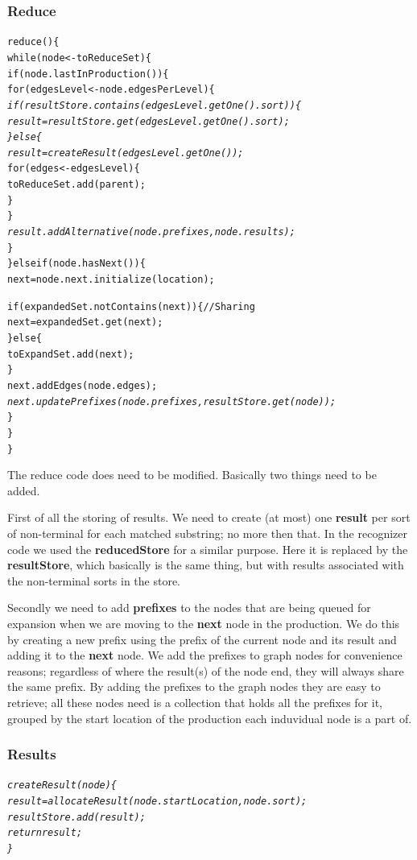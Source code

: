 \documentclass[a4paper,10pt]{article}
\begin{document}
\pagebreak
\subsubsection{Reduce}
{\small
\begin{alltt}
reduce()\{
  while(node <- toReduceSet)\{
    if(node.lastInProduction())\{
      for(edgesLevel <- node.edgesPerLevel)\{\textit{
        if(resultStore.contains(edgesLevel.getOne().sort))\{
          result = resultStore.get(edgesLevel.getOne().sort);
        \}else\{
          result = createResult(edgesLevel.getOne());}
          for(edges <- edgesLevel)\{
            toReduceSet.add(parent);
          \}
        \}\textit{
        result.addAlternative(node.prefixes, node.results);}
      \}
    \}else if(node.hasNext())\{
      next = node.next.initialize(location);
      
      if(expandedSet.notContains(next))\{ // Sharing
        next = expandedSet.get(next);
      \}else\{
        toExpandSet.add(next);
      \}
      next.addEdges(node.edges);\textit{
      next.updatePrefixes(node.prefixes, resultStore.get(node));}
    \}
  \}
\}
\end{alltt}
}

The reduce code does need to be modified. Basically two things need to be added.

First of all the storing of results. We need to create (at most) one {\bf result} per sort of non-terminal for each matched substring; no more then that. In the recognizer code we used the {\bf reducedStore} for a similar purpose. Here it is replaced by the {\bf resultStore}, which basically is the same thing, but with results associated with the non-terminal sorts in the store.

Secondly we need to add {\bf prefixes} to the nodes that are being queued for expansion when we are moving to the {\bf next} node in the production. We do this by creating a new prefix using the prefix of the current node and its result and adding it to the {\bf next} node. We add the prefixes to graph nodes for convenience reasons; regardless of where the result(s) of the node end, they will always share the same prefix. By adding the prefixes to the graph nodes they are easy to retrieve; all these nodes need is a collection that holds all the prefixes for it, grouped by the start location of the production each induvidual node is a part of.

\pagebreak
\subsubsection{Results}
{\small
\begin{alltt}
\textit{createResult(node)\{
  result = allocateResult(node.startLocation, node.sort);
  resultStore.add(result);
  return result;
\}}
\end{alltt}
}
\end{document}
